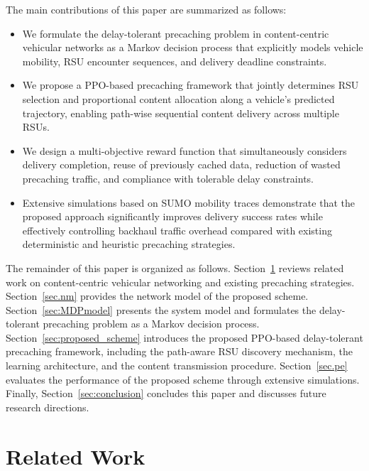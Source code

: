 The main contributions of this paper are summarized as follows:

\begin{itemize}

\item We formulate the delay-tolerant precaching problem in content-centric vehicular networks as a Markov decision process that explicitly models vehicle mobility, RSU encounter sequences, and delivery deadline constraints.

\item We propose a PPO-based precaching framework that jointly determines RSU selection and proportional content allocation along a vehicle's predicted trajectory, enabling path-wise sequential content delivery across multiple RSUs.

\item We design a multi-objective reward function that simultaneously considers delivery completion, reuse of previously cached data, reduction of wasted precaching traffic, and compliance with tolerable delay constraints.

\item Extensive simulations based on SUMO mobility traces demonstrate that the proposed approach significantly improves delivery success rates while effectively controlling backhaul traffic overhead compared with existing deterministic and heuristic precaching strategies.

\end{itemize}


The remainder of this paper is organized as follows. 
Section~\ref{sec:rw} reviews related work on content-centric vehicular networking and existing precaching strategies. 
Section~\ref{sec.nm} provides the network model of the proposed scheme.
Section~\ref{sec:MDPmodel} presents the system model and formulates the delay-tolerant precaching problem as a Markov decision process. 
Section~\ref{sec:proposed_scheme} introduces the proposed PPO-based delay-tolerant precaching framework, including the path-aware RSU discovery mechanism, the learning architecture, and the content transmission procedure. 
Section~\ref{sec.pe} evaluates the performance of the proposed scheme through extensive simulations. 
Finally, Section~\ref{sec:conclusion} concludes this paper and discusses future research directions.


\section{Related Work}
\label{sec:rw}


